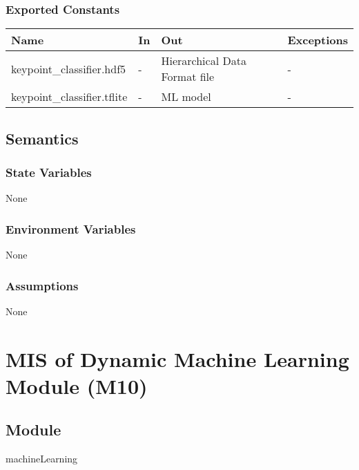 \documentclass[12pt, titlepage]{article}
\begin{document}
\subsubsection{Exported Constants}

\begin{center}
\begin{tabular}{p{5cm} p{3cm} p{3cm} p{4cm}}
\hline
\textbf{Name} & \textbf{In} & \textbf{Out} & \textbf{Exceptions} \\
\hline
keypoint\_classifier.hdf5 & - & Hierarchical Data Format file & - \\
keypoint\_classifier.tflite & - & ML model & - \\
\hline
\end{tabular}
\end{center}

\subsection{Semantics}

\subsubsection{State Variables}

None\\

\subsubsection{Environment Variables}

None\\

\subsubsection{Assumptions}

None\\

\newpage
\section{MIS of Dynamic Machine Learning Module (M10)} \label{M11}

\subsection{Module}

machineLearning\\
\end{document}
